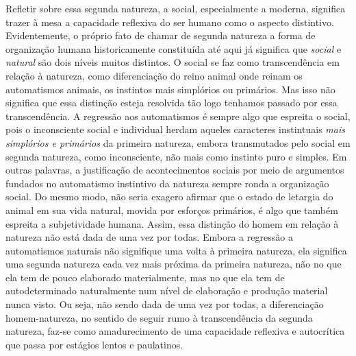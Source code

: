 Refletir sobre essa segunda natureza, a social, especialmente a moderna,
significa trazer à mesa a capacidade reflexiva do ser humano como o
aspecto distintivo. Evidentemente, o próprio fato de chamar de segunda
natureza a forma de organização humana historicamente constituída até
aqui já significa que \emph{social} e \emph{natural} são dois níveis
muitos distintos. O social se faz como transcendência em relação à
natureza, como diferenciação do reino animal onde reinam os automatismos
animais, os instintos mais simplórios ou primários. Mas isso não
significa que essa distinção esteja resolvida tão logo tenhamos passado
por essa transcendência. A regressão aos automatismos é sempre algo que
espreita o social, pois o inconsciente social e individual herdam
aqueles caracteres instintuais \emph{mais simplórios e primários} da
primeira natureza, embora transmutados pelo social em segunda natureza,
como inconsciente, não mais como instinto puro e simples. Em outras
palavras, a justificação de acontecimentos sociais por meio de
argumentos fundados no automatismo instintivo da natureza sempre ronda a
organização social. Do mesmo modo, não seria exagero afirmar que o
estado de letargia do animal em sua vida natural, movida por esforços
primários, é algo que também espreita a subjetividade humana. Assim,
essa distinção do homem em relação à natureza não está dada de uma vez
por todas. Embora a regressão a automatismos naturais não signifique uma
volta à primeira natureza, ela significa uma segunda natureza cada vez
mais próxima da primeira natureza, não no que ela tem de pouco elaborado
materialmente, mas no que ela tem de autodeterminado naturalmente num
nível de elaboração e produção material nunca visto. Ou seja, não sendo
dada de uma vez por todas, a diferenciação homem-natureza, no sentido de
seguir rumo à transcendência da segunda natureza, faz-se como
amadurecimento de uma capacidade reflexiva e autocrítica que passa por
estágios lentos e paulatinos.


